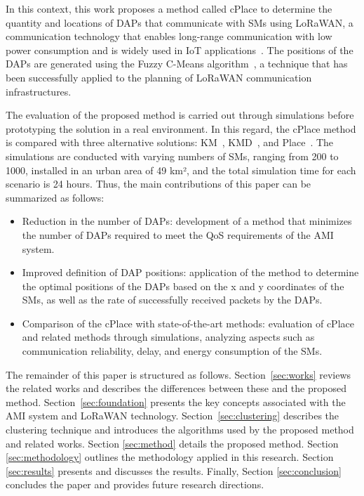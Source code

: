 \documentclass[a4paper,fleqn]{cas-dc}
\begin{document}
In this context, this work proposes a method called cPlace to determine the quantity and locations of \gls{DAPs} that communicate with \gls{SMs} using \gls{LoRaWAN}, a communication technology that enables long-range communication with low power consumption and is widely used in \gls{IoT} applications~\cite{junior2023data}. The positions of the \gls{DAPs} are generated using the Fuzzy C-Means algorithm~\cite{yang2023unsupervised}, a technique that has been successfully applied to the planning of \gls{LoRaWAN} communication infrastructures.

The evaluation of the proposed method is carried out through simulations before prototyping the solution in a real environment. In this regard, the cPlace method is compared with three alternative solutions: KM~\cite{piechowiak2023lorawan}, KMD~\cite{gallardo2021clustering}, and Place~\cite{matni2020lorawan}. The simulations are conducted with varying numbers of \gls{SMs}, ranging from 200 to 1000, installed in an urban area of 49 km², and the total simulation time for each scenario is 24 hours. Thus, the main contributions of this paper can be summarized as follows:

\begin{itemize}
    \item Reduction in the number of \gls{DAPs}: development of a method that minimizes the number of \gls{DAPs} required to meet the \gls{QoS} requirements of the \gls{AMI} system.
    
    \item Improved definition of DAP positions: application of the method to determine the optimal positions of the \gls{DAPs} based on the x and y coordinates of the \gls{SMs}, as well as the rate of successfully received packets by the \gls{DAPs}.
    
    \item Comparison of the cPlace with state-of-the-art methods: evaluation of cPlace and related methods through simulations, analyzing aspects such as communication reliability, delay, and energy consumption of the \gls{SMs}.
\end{itemize}

The remainder of this paper is structured as follows. Section~\ref{sec:works} reviews the related works and describes the differences between these and the proposed method. Section~\ref{sec:foundation} presents the key concepts associated with the \gls{AMI} system and \gls{LoRaWAN} technology. Section~\ref{sec:clustering} describes the clustering technique and introduces the algorithms used by the proposed method and related works. Section \ref{sec:method} details the proposed method. Section \ref{sec:methodology} outlines the methodology applied in this research. Section \ref{sec:results} presents and discusses the results. Finally, Section \ref{sec:conclusion} concludes the paper and provides future research directions.
\end{document}
